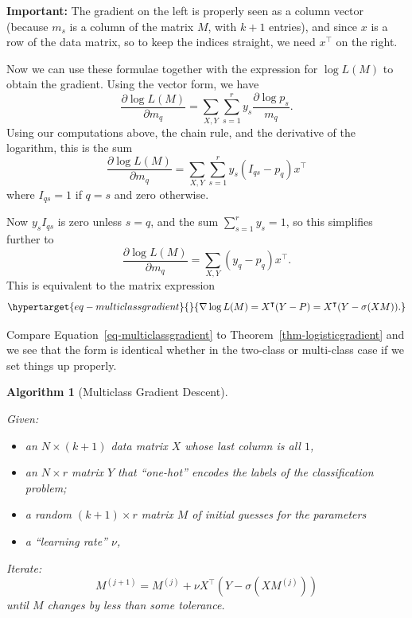 \documentclass[
  11pt,
  letterpaper,
]{scrbook}
\providecommand{\tightlist}{%
  \setlength{\itemsep}{0pt}\setlength{\parskip}{0pt}}\usepackage{longtable,booktabs,array}
\theoremstyle{plain}
\newtheorem{algorithm}{Algorithm}[chapter]
\theoremstyle{plain}
\theoremstyle{remark}
\begin{document}
\textbf{Important:} The gradient on the left is properly seen as a
column vector (because \(m_{s}\) is a column of the matrix \(M\), with
\(k+1\) entries), and since \(x\) is a row of the data matrix, so to
keep the indices straight, we need \(x^{\intercal}\) on the right.

Now we can use these formulae together with the expression for
\(\log L(M)\) to obtain the gradient. Using the vector form, we have \[
\frac{\partial \log L(M)}{\partial m_{q}} = \sum_{X,Y}\sum_{s=1}^{r} y_{s}\frac{\partial \log p_{s}}{m_{q}}.
\] Using our computations above, the chain rule, and the derivative of
the logarithm, this is the sum \[
\frac{\partial \log L(M)}{\partial m_{q}} =\sum_{X,Y}\sum_{s=1}^{r} y_{s}(I_{qs}-p_{q})x^{\intercal}
\] where \(I_{qs}=1\) if \(q=s\) and zero otherwise.

Now \(y_{s}I_{qs}\) is zero unless \(s=q\), and the sum
\(\sum_{s=1}^{r} y_{s}=1\), so this simplifies further to \[
\frac{\partial \log L(M)}{\partial m_{q}} = \sum_{X,Y} (y_{q}-p_{q})x^{\intercal}.
\] This is equivalent to the matrix expression
\begin{equation}\protect\hypertarget{eq-multiclassgradient}{}{
\nabla \log L(M) = X^{\intercal}(Y-P)=X^{\intercal}(Y-\sigma(XM)).
}\label{eq-multiclassgradient}\end{equation}

Compare Equation~\ref{eq-multiclassgradient} to
Theorem~\ref{thm-logisticgradient} and we see that the form is identical
whether in the two-class or multi-class case if we set things up
properly.

\leavevmode{}%
\begin{algorithm}[Multiclass Gradient Descent]\label{alg-graddescent}

Given:

\begin{itemize}
\tightlist
\item
  an \(N\times(k+1)\) data matrix \(X\) whose last column is all \(1\),
\item
  an \(N\times r\) matrix \(Y\) that ``one-hot'' encodes the labels of
  the classification problem;
\item
  a random \((k+1)\times r\) matrix \(M\) of initial guesses for the
  parameters
\item
  a ``learning rate'' \(\nu\),
\end{itemize}

Iterate: \[
M^{(j+1)}=M^{(j)}+\nu X^{\intercal}(Y-\sigma(XM^{(j)}))
\] until \(M\) changes by less than some tolerance.

\end{algorithm}
\end{document}
